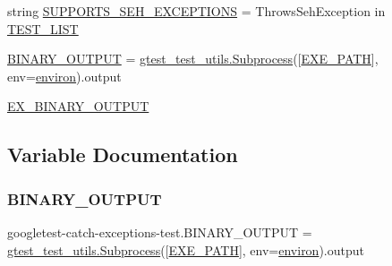 \begin{DoxyCompactItemize}
string \mbox{\hyperlink{namespacegoogletest-catch-exceptions-test_ae72da371134ddf921c9edf36788f7ecd}{S\+U\+P\+P\+O\+R\+T\+S\+\_\+\+S\+E\+H\+\_\+\+E\+X\+C\+E\+P\+T\+I\+O\+NS}} = \textquotesingle{}Throws\+Seh\+Exception\textquotesingle{} in \mbox{\hyperlink{namespacegoogletest-catch-exceptions-test_a8002b73eafb58268e677846819651377}{T\+E\+S\+T\+\_\+\+L\+I\+ST}}
\item 
\mbox{\hyperlink{namespacegoogletest-catch-exceptions-test_ac02efc4cd44ac24ba2c8d34a0e787693}{B\+I\+N\+A\+R\+Y\+\_\+\+O\+U\+T\+P\+UT}} = \mbox{\hyperlink{classgtest__test__utils_1_1_subprocess}{gtest\+\_\+test\+\_\+utils.\+Subprocess}}(\mbox{[}\mbox{\hyperlink{namespacegoogletest-catch-exceptions-test_a188751df0f5c5c09a9cbb394ef711725}{E\+X\+E\+\_\+\+P\+A\+TH}}\mbox{]}, env=\mbox{\hyperlink{namespacegoogletest-catch-exceptions-test_ac016f17c70e0883eb6b14abcfaf5da44}{environ}}).output
\item 
\mbox{\hyperlink{namespacegoogletest-catch-exceptions-test_a291a1ed9c774889e37aab2e7a526fc80}{E\+X\+\_\+\+B\+I\+N\+A\+R\+Y\+\_\+\+O\+U\+T\+P\+UT}}
\end{DoxyCompactItemize}


\subsection{Variable Documentation}
\mbox{\label{namespacegoogletest-catch-exceptions-test_ac02efc4cd44ac24ba2c8d34a0e787693}} 
\subsubsection{\texorpdfstring{BINARY\_OUTPUT}{BINARY\_OUTPUT}}
{\footnotesize\ttfamily googletest-\/catch-\/exceptions-\/test.\+B\+I\+N\+A\+R\+Y\+\_\+\+O\+U\+T\+P\+UT = \mbox{\hyperlink{classgtest__test__utils_1_1_subprocess}{gtest\+\_\+test\+\_\+utils.\+Subprocess}}(\mbox{[}\mbox{\hyperlink{namespacegoogletest-catch-exceptions-test_a188751df0f5c5c09a9cbb394ef711725}{E\+X\+E\+\_\+\+P\+A\+TH}}\mbox{]}, env=\mbox{\hyperlink{namespacegoogletest-catch-exceptions-test_ac016f17c70e0883eb6b14abcfaf5da44}{environ}}).output}

\mbox{\label{namespacegoogletest-catch-exceptions-test_ac016f17c70e0883eb6b14abcfaf5da44}} 
